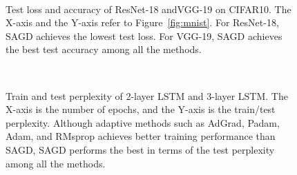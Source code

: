 \documentclass[11pt]{article}
\begin{document}
\begin{figure}[t!]
\mbox{
\hspace{-0.1in}
 }
 \caption[]{Test loss and accuracy of ResNet-18 andVGG-19 on CIFAR10. The X-axis and the
Y-axis refer to Figure~\ref{fig:mnist}. For ResNet-18, SAGD achieves the lowest test loss. For VGG-19, SAGD achieves the best test accuracy among all the methods. } 
 \label{fig:cifar10}
\end{figure}

\begin{figure}[t!]
\mbox{
\hspace{-0.1in}
}
\vspace{-0.1in}
 \caption[]{Train and test perplexity of 2-layer LSTM and 3-layer LSTM. The X-axis is the number of epochs, and the Y-axis is the train/test perplexity. Although adaptive methods such as AdGrad, Padam, Adam, and RMsprop achieves better training performance than SAGD, SAGD performs the best in terms of the test perplexity among all the methods.} 
 \label{fig:ptb}
\end{figure}
\end{document}
